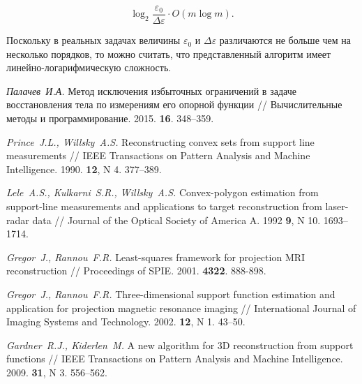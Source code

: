 \documentclass[a4paper, 10pt]{article}
\theoremstyle{definition}
\theoremstyle{plain}
\theoremstyle{plain}
\begin{document}
\begin{equation*}
 \log_{2} \frac{\varepsilon_{0}}{\Delta \varepsilon} \cdot O(m \log m).
\end{equation*}

Поскольку в реальных задачах величины $\varepsilon_{0}$ и
$\Delta \varepsilon$ различаются не больше чем на несколько порядков, то
можно считать, что представленный алгоритм имеет линейно-логарифмическую
сложность.

\begin{thebibliography}{50}

\emph{Палачев~И.А.}
Метод исключения избыточных ограничений в задаче восстановления тела по
измерениям его опорной функции //
Вычислительные методы и программирование.
2015.
\textbf{16}.
348--359.

\emph{Prince~J.L., Willsky~A.S.}
Reconstructing convex sets from support line measurements //
IEEE Transactions on Pattern Analysis and Machine Intelligence.
1990.
\textbf{12},
N 4.
377--389.

\emph{Lele~A.S., Kulkarni~S.R., Willsky~A.S.}
Convex-polygon estimation from support-line measurements and applications to
target reconstruction from laser-radar data //
Journal of the Optical Society of America A.
1992
\textbf{9},
N 10.
1693--1714.

\emph{Gregor~J., Rannou~F.R.}
Least-squares framework for projection {MRI} reconstruction //
Proceedings of SPIE.
2001.
\textbf{4322}.
888-898.

\emph{Gregor~J., Rannou~F.R.}
Three-dimensional support function estimation and application for projection
magnetic resonance imaging //
International Journal of Imaging Systems and Technology.
2002.
\textbf{12},
N 1.
43--50.

\emph{Gardner~R.J., Kiderlen~M.}
A new algorithm for 3D reconstruction from support functions //
IEEE Transactions on Pattern Analysis and Machine Intelligence.
2009.
\textbf{31},
N 3.
556--562.

\end{thebibliography}
\end{document}
